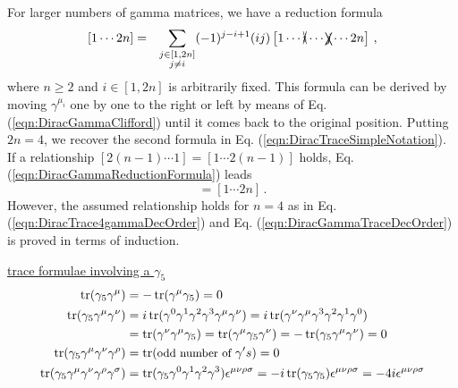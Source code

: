 For larger numbers of gamma matrices,
we have a reduction formula
\begin{eqnarray}
\left[1 \cdots 2n \right] 
&=&
\sum_{\substack{j \in [1, 2n] \\ j \neq i}}
(-1)^{j - i +1} (ij) \left[ 1 \cdots \xcancel{i} \cdots \xcancel{j} \cdots 2n \right]\,,
\label{eqn:DiracGammaReductionFormula}
\end{eqnarray}
where $n \geq 2$ and $i \in [1, 2n]$ is arbitrarily fixed. This formula can be derived by
moving $\gamma^{\mu_i}$ one by one to the right or left by means of Eq. (\ref{eqn:DiracGammaClifford})
until it comes back to the original position. Putting $2n = 4$, we recover the second formula in
Eq. (\ref{eqn:DiracTraceSimpleNotation}).
If  a relationship $[2(n-1) \cdots 1 ] = [1 \cdots 2(n-1) ]$ holds, Eq. (\ref{eqn:DiracGammaReductionFormula})
leads 
\begin{equation}
[2n \cdots 1] = [1 \cdots 2n]\,.
\label{eqn:DiracGammaTraceDecOrder}
\end{equation}
However, the assumed relationship holds for $n = 4$ as in Eq. (\ref{eqn:DiracTrace4gammaDecOrder})
and Eq. (\ref{eqn:DiracGammaTraceDecOrder}) is proved in terms of induction.

\bigskip

\noindent
\underline{trace formulae involving a $\gamma_5$}
\begin{equation}
\begin{split}
\operatorname{tr}(\gamma_5 \gamma^{\mu})
&=
-\operatorname{tr}(\gamma^{\mu} \gamma_5 )
= 0
\\
\operatorname{tr}(\gamma_5 \gamma^{\mu} \gamma^{\nu})
&=
i \operatorname{tr}( \gamma^0 \gamma^1 \gamma^2 \gamma^3  \gamma^{\mu} \gamma^{\nu} )
=
i \operatorname{tr}(\gamma^{\nu} \gamma^{\mu}  \gamma^3 \gamma^2 \gamma^1 \gamma^0  )
\\
&=
\operatorname{tr}( \gamma^{\nu} \gamma^{\mu}  \gamma_5)
=
\operatorname{tr}( \gamma^{\mu}  \gamma_5 \gamma^{\nu} )
=
-\operatorname{tr}( \gamma_5 \gamma^{\mu}  \gamma^{\nu})
= 0
\\
\operatorname{tr}(\gamma_5 \gamma^{\mu} \gamma^{\nu} \gamma^{\rho})
&=
\operatorname{tr}(\mbox{\small odd number of } \gamma's)
= 0
\\
\operatorname{tr}(\gamma_5 \gamma^{\mu} \gamma^{\nu} \gamma^{\rho} \gamma^{\sigma})
&=
\operatorname{tr}(\gamma_5  \gamma^0 \gamma^1 \gamma^2 \gamma^3)
\epsilon^{\mu \nu \rho \sigma}
= -i \operatorname{tr}({\gamma_5  \gamma_5}) \epsilon^{\mu \nu \rho \sigma}
= -4 i \epsilon^{\mu \nu \rho \sigma}
\end{split}
\end{equation}


